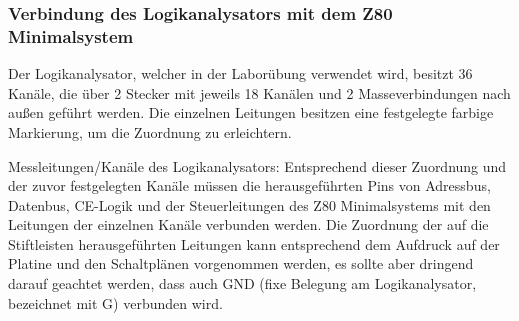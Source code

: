 \subsubsection{Verbindung des Logikanalysators mit dem Z80 Minimalsystem}
Der Logikanalysator, welcher in der Laborübung verwendet wird, besitzt 36 Kanäle, die über 2 Stecker mit jeweils 18 Kanälen und 2 Masseverbindungen nach außen geführt werden. Die einzelnen Leitungen besitzen eine festgelegte farbige Markierung, um die Zuordnung zu erleichtern.

Messleitungen/Kanäle des Logikanalysators:
Entsprechend dieser Zuordnung und der zuvor festgelegten Kanäle müssen die herausgeführten Pins von Adressbus, Datenbus, CE-Logik und der Steuerleitungen des Z80 Minimalsystems mit den Leitungen der einzelnen Kanäle verbunden werden. Die Zuordnung der auf die Stiftleisten herausgeführten Leitungen kann entsprechend dem Aufdruck auf der Platine und den Schaltplänen vorgenommen werden, es sollte aber dringend darauf geachtet werden, dass auch GND (fixe Belegung am Logikanalysator, bezeichnet mit G) verbunden wird.

